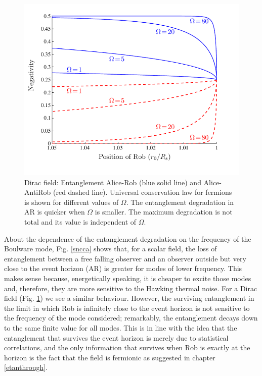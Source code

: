 \begin{figure}[h]
\begin{center}
\includegraphics[width=.85\textwidth]{negativityCCA}
\caption{Dirac field: Entanglement Alice-Rob (blue solid line) and
Alice-AntiRob (red dashed line). Universal conservation law for fermions
is shown for different values of $\Omega$. The entanglement
degradation in AR is quicker when $\Omega$ is smaller. The maximum
degradation is not total and its value is independent of $\Omega$.
}
\label{dncca}
\end{center}
\end{figure}

About the dependence of the entanglement degradation on the frequency
of the Boulware mode, Fig. \ref{sncca}  shows that, for a scalar field, the
loss of entanglement between a free falling observer and an observer
outside but very close to the event horizon (AR) is greater for modes of
lower frequency. This makes sense because, energetically speaking, it is
cheaper to excite those modes and, therefore, they are more sensitive to
the Hawking thermal noise. For a Dirac field (Fig. \ref{dncca}) we see a
similar behaviour. However, the surviving
entanglement in the limit in which Rob is infinitely close to the event
horizon is not sensitive to the frequency of the mode considered;
remarkably,  the entanglement decays down to the same finite value for all
modes. This is in line with the idea that the entanglement that survives the
event horizon is merely due to statistical correlations,  and the only
information that survives when Rob is exactly at the horizon is the fact
that the field is fermionic as suggested in chapter \ref{etanthrough}.




